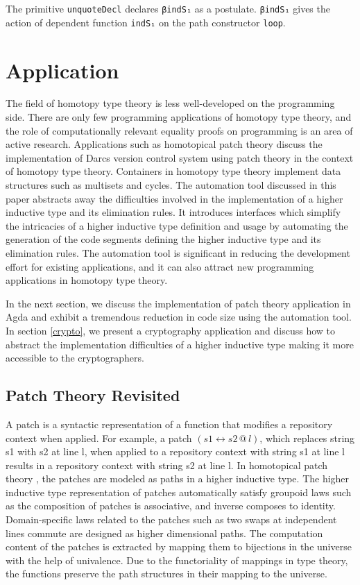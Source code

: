 \documentclass[sigplan,10pt]{acmart}
\begin{document}
The primitive {\tt unquoteDecl} declares {\tt βindS₁} as a postulate. {\tt βindS₁} gives the action of dependent function {\tt indS₁} on the path constructor {\tt loop}.

\section{Application}

The field of homotopy type theory is less well-developed on the programming side. There are only few programming applications of homotopy type theory, and the role of computationally relevant equality proofs on programming is an area of active research. Applications such as homotopical patch theory \cite{Angiuli-2014} discuss the implementation of Darcs \cite{Darcs-2005} version control system using patch theory \cite{Mimram-2013} \cite{Jason-2009} in the context of homotopy type theory. Containers in homotopy type theory \cite{Altenkirch-2014} \cite{Abbott-2005} implement data structures such as multisets and cycles. The automation tool discussed in this paper abstracts away the difficulties involved in the implementation of a higher inductive type and its elimination rules. It introduces interfaces which simplify the intricacies of a higher inductive type definition and usage by automating the generation of the code segments defining the higher inductive type and its elimination rules. The automation tool is significant in reducing the development effort for existing applications, and it can also attract new programming applications in homotopy type theory.

In the next section, we discuss the implementation of patch theory application in Agda and exhibit a tremendous reduction in code size using the automation tool. In section \ref{crypto}, we present a cryptography application and discuss how to abstract the implementation difficulties of a higher inductive type making it more accessible to the cryptographers.

\subsection{Patch Theory Revisited}
\label{patch-theory}
A patch is a syntactic representation of a function that modifies a repository context when applied. For example, a patch $(s1 \leftrightarrow s2 \, @ \, l)$, which replaces string s1 with s2 at line l, when applied to a repository context with string s1 at line l results in a repository context with string s2 at line l. In homotopical patch theory \cite{Angiuli-2014}, the patches are modeled as paths in a higher inductive type. The higher inductive type representation of patches automatically satisfy groupoid laws such as the composition of patches is associative, and inverse composes to identity. Domain-specific laws related to the patches such as two swaps at independent lines commute are designed as higher dimensional paths. The computation content of the patches is extracted by mapping them to bijections in the universe with the help of univalence. Due to the functoriality of mappings in type theory, the functions preserve the path structures in their mapping to the universe.
\end{document}
